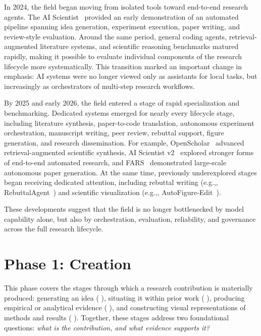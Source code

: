 \documentclass{llmxive}
\providecommand{\eg}{e.g.,\xspace}
\providecommand{\levelbadge}[2]{  \tcbox[on line, nobeforeafter, tcbox raise base,
         boxsep=0pt, left=2pt, right=2pt, top=0.5pt, bottom=0.5pt,
         arc=1.5pt, boxrule=0.3pt,
         colback=#1!15, colframe=#1!70]    {\scriptsize\bfseries\sffamily#2}}
\providecommand{\Sone}{\texorpdfstring{\levelbadge{S1color}{S1}}{S1}\xspace}
\providecommand{\Stwo}{\texorpdfstring{\levelbadge{S2color}{S2}}{S2}\xspace}
\providecommand{\Sthree}{\texorpdfstring{\levelbadge{S3color}{S3}}{S3}\xspace}
\providecommand{\Sfour}{\texorpdfstring{\levelbadge{S4color}{S4}}{S4}\xspace}
\begin{document}
In 2024, the field began moving from isolated tools toward end-to-end research agents. The AI Scientist~\cite{lu2024aiscientist} provided an early demonstration of an automated pipeline spanning idea generation, experiment execution, paper writing, and review-style evaluation. Around the same period, general coding agents, retrieval-augmented literature systems, and scientific reasoning benchmarks matured rapidly, making it possible to evaluate individual components of the research lifecycle more systematically. This transition marked an important change in emphasis: AI systems were no longer viewed only as assistants for local tasks, but increasingly as orchestrators of multi-step research workflows.

By 2025 and early 2026, the field entered a stage of rapid specialization and benchmarking. Dedicated systems emerged for nearly every lifecycle stage, including literature synthesis, paper-to-code translation, autonomous experiment orchestration, manuscript writing, peer review, rebuttal support, figure generation, and research dissemination. For example, OpenScholar~\cite{openscholar2025} advanced retrieval-augmented scientific synthesis, AI Scientist v2~\cite{yamada2025aiscientistv2} explored stronger forms of end-to-end automated research, and FARS~\cite{fars2026_report} demonstrated large-scale autonomous paper generation. At the same time, previously underexplored stages began receiving dedicated attention, including rebuttal writing (\eg, RebuttalAgent~\cite{rebuttalagent2026}) and scientific visualization (\eg, AutoFigure-Edit~\cite{autofigure2026}). 

These developments suggest that the field is no longer bottlenecked by model capability alone, but also by orchestration, evaluation, reliability, and governance across the full research lifecycle.


\section{Phase 1: Creation}
\label{sec:creation}

This phase covers the stages through which a research contribution is materially produced: generating an idea (\Sone), situating it within prior work (\Stwo), producing empirical or analytical evidence (\Sthree), and constructing visual representations of methods and results (\Sfour). Together, these stages address two foundational questions: \emph{what is the contribution, and what evidence supports it?}
\end{document}
